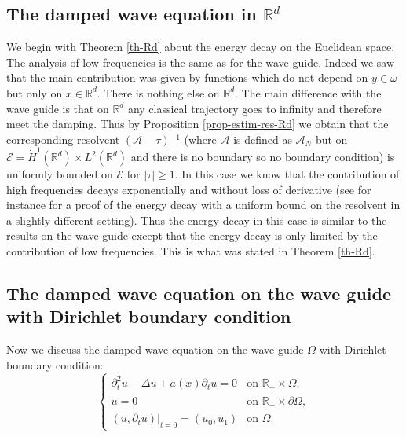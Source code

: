 \documentclass[10pt, a4paper,reqno]{amsart}
\theoremstyle{plain}
\theoremstyle{definition}
\theoremstyle{remark}
\begin{document}
\subsection{The damped wave equation in \texorpdfstring{${\mathbb{R}}^d$}{Rd}}

We begin with Theorem \ref{th-Rd} about the energy decay on the Euclidean space. The analysis of low frequencies is the same as for the wave guide. Indeed we saw that the main contribution was given by functions which do not depend on $y \in {\omega}$ but only on $x \in {\mathbb{R}}^d$. There is nothing else on ${\mathbb{R}}^d$. The main difference with the wave guide is that on ${\mathbb{R}}^d$ any classical trajectory goes to infinity and therefore meet the damping. Thus by Proposition \ref{prop-estim-res-Rd} we obtain that the corresponding resolvent $({{\mathcal A}}-{\tau}){^{-1}}$ (where ${{\mathcal A}}$ is defined as ${{{\mathcal A}}_N}$ but on ${\mathscr E} = \dot H^1({\mathbb{R}}^d) \times L^2({\mathbb{R}}^d)$ and there is no boundary so no boundary condition) is uniformly bounded on ${\mathscr E}$ for ${\left\vert {\tau}\right\vert} {\geqslant} 1$. In this case we know that the contribution of high frequencies decays exponentially and without loss of derivative (see for instance \cite{royer-diss-schrodinger-guide} for a proof of the energy decay with a uniform bound on the resolvent in a slightly different setting). Thus the energy decay in 
this case is similar to the results 
on the wave guide except that the energy decay is only limited by the contribution of low frequencies. This is what was stated in Theorem \ref{th-Rd}.

\subsection{The damped wave equation on the wave guide with Dirichlet boundary condition}

Now we discuss the damped wave equation on the wave guide ${\Omega}$ with Dirichlet boundary condition:
\begin{equation} \label{wave-dirichlet} 
\begin{cases}
\partial_t^2 u  -{\Delta} u + a(x) \partial_t u = 0  & \text{on  }  {\mathbb{R}}_+ \times {\Omega}, \\
u = 0 & \text{on } {\mathbb{R}}_+ \times \partial {\Omega},\\
{\left.{(u , \partial_t u )}\right|_{{t = 0}}} = (u_0, u_1) &  \text{on } {\Omega}.
\end{cases}
\end{equation}
\end{document}
